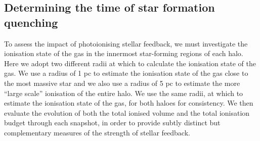 \documentclass[graphics, twocolumn, usenatbib]{mn2e}
\begin{document}

\subsection{Determining the time of star formation quenching}\label{cloudy:results}
To assess the impact of photoionising stellar feedback, we must investigate the ionisation state
of the gas in the innermost star-forming regions of each halo.
Here we adopt two different radii at which to calculate the ionisation state of the gas.
We use a radius of 1 pc to estimate the ionisation state of the gas close to the most massive star
and we also use a radius of 5 pc to estimate the more ``large scale'' ionisation of the entire halo. 
We use the same radii, at which to estimate the ionisation state of the gas, for both haloes
for consistency. We then evaluate the evolution of both the total ionised volume and the
total ionisation budget through each snapshot, in order to provide subtly distinct but
complementary measures of the strength of stellar feedback.
\end{document}
